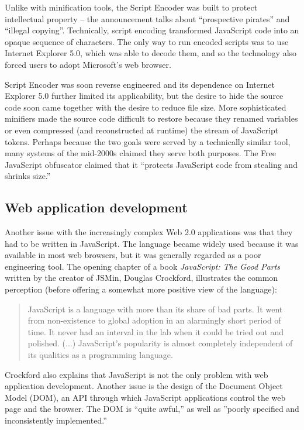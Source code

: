 Unlike with minification tools, the Script Encoder was built to
protect intellectual property -- the announcement talks about ``pros\-pective pirates''
and ``illegal copying''. Technically, script encoding transformed Java\-Script code into an
opaque sequence of characters. The only way to run encoded scripts was to use Internet Explorer 5.0,
which was able to decode them, and so the technology also forced users to adopt Microsoft's web browser.

Script Encoder was soon reverse engineered and its dependence on Internet Explorer 5.0
further limited its applicability, but the desire to hide the source code soon came together with
the desire to reduce file size. More sophisticated minifiers made the source code difficult to
restore because they renamed variables or even compressed (and reconstructed at runtime) the stream
of JavaScript tokens.
Perhaps because the two goals were served by a technically similar tool, many systems of the
mid-2000s claimed they serve both purposes. The Free JavaScript obfuscator claimed
that it ``protects JavaScript code from stealing and shrinks size.''

\subsection{Web application development}

Another issue with the increasingly complex Web 2.0 applications was that they had to be
written in JavaScript. The language became widely used because it was available in most web browsers,
but it was generally regarded as a poor engineering tool. The opening chapter of a book
\emph{JavaScript: The Good Parts} written by the creator of
JSMin, Douglas Crockford, illustrates the common perception (before offering a somewhat more positive
view of the language):

\begin{quote}
JavaScript is a language with more than its share of bad parts. It went from non-existence
to global adoption in an alarmingly short period of time. It never had an interval in the lab
when it could be tried out and polished. (...) JavaScript's popularity
is almost completely independent of its qualities as a programming language.
\end{quote}

Crockford also explains that JavaScript is not the only problem with web application development.
Another issue is the design of the Document Object Model (DOM), an API through which JavaScript
applications control the web page and the browser. The DOM is ``quite awful,'' as well as ''poorly
specified and inconsistently implemented.''

